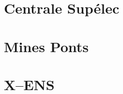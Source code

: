 \bigskip













\section{Centrale Supélec}




%




\section{Mines Ponts}









\section{X--ENS}
